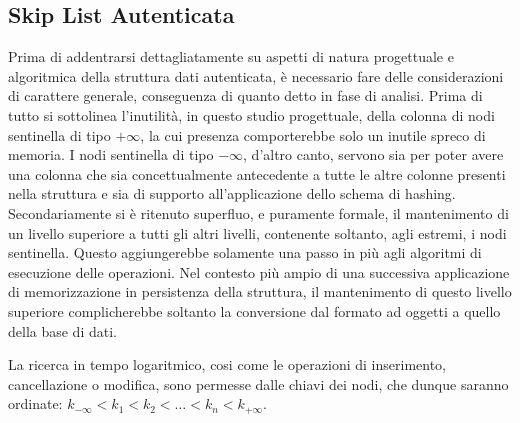 	\subsection{Skip List Autenticata}
	
	
	Prima di addentrarsi dettagliatamente su aspetti di natura progettuale e algoritmica della struttura dati autenticata, è necessario fare delle considerazioni di carattere generale, conseguenza di quanto detto in fase di analisi.
	Prima di tutto si sottolinea l'inutilità, in questo studio progettuale, della colonna di nodi sentinella di tipo $ +\infty $, la cui presenza comporterebbe solo un inutile spreco di memoria. I nodi sentinella di tipo $ -\infty $, d'altro canto, servono sia per poter avere una colonna che sia concettualmente antecedente a tutte le altre colonne presenti nella struttura e sia di supporto all'applicazione dello schema di hashing.
	Secondariamente si è ritenuto superfluo, e puramente formale, il mantenimento di un livello superiore a tutti gli altri livelli, contenente soltanto, agli estremi, i nodi sentinella. Questo aggiungerebbe solamente una passo in più agli algoritmi di esecuzione delle operazioni. Nel contesto più ampio di una successiva applicazione di memorizzazione in persistenza della struttura, il mantenimento di questo livello superiore complicherebbe soltanto la conversione dal formato ad oggetti a quello della base di dati.
	
	La ricerca in tempo logaritmico, cosi come le operazioni di inserimento, cancellazione o modifica, sono permesse dalle chiavi dei nodi, che dunque saranno ordinate: $ k_{-\infty} < k_{1} < k_{2} < \dots < k_{n} < k_{+\infty} $.
	
